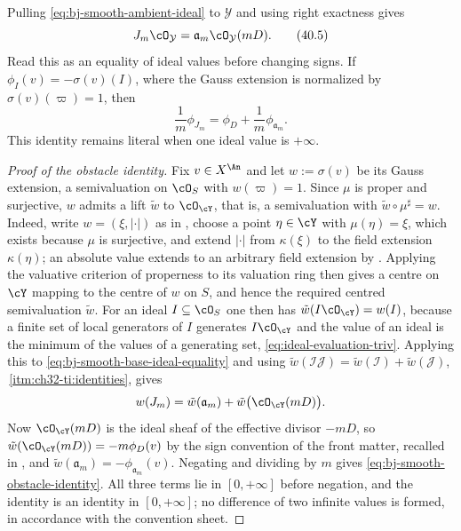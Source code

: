 Pulling \eqref{eq:bj-smooth-ambient-ideal} to $\mathcal Y$ and using
right exactness gives
\[
 J_m\cO_{\mathcal Y}
   =\mathfrak a_m\cO_{\mathcal Y}(mD).
\tag{40.5}\label{eq:bj-smooth-base-ideal-equality}
\]
Read this as an equality of ideal values before changing signs.  If
$\phi_I(v)=-\sigma(v)(I)$, where the Gauss extension is normalized by
$\sigma(v)(\varpi)=1$, then
\[
 \frac1m\phi_{J_m}
   =\phi_D+\frac1m\phi_{\mathfrak a_m}.
\tag{40.6}\label{eq:bj-smooth-obstacle-identity}
\]
This identity remains literal when one ideal value is $+\infty$.

\begin{proof}[Proof of the obstacle identity]
Fix $v\in X^{\An}$ and let $w:=\sigma(v)$ be its Gauss extension, a
semivaluation on $\cO_S$ with $w(\varpi)=1$.  Since $\mu$ is proper
and surjective, $w$ admits a lift $\tilde w$ to $\cO_{\cY}$,
that is, a semivaluation with $\tilde w\circ\mu^\sharp=w$.  Indeed, write
$w=(\xi,|\cdot|)$ as in , choose a point
$\eta\in\cY$ with $\mu(\eta)=\xi$, which exists because $\mu$ is
surjective, and extend $|\cdot|$ from $\kappa(\xi)$ to the field
extension $\kappa(\eta)$; an absolute value extends to an arbitrary field
extension by \cite[Chapter~VI, \S4]{ZariskiSamuelII}.  Applying the
valuative criterion of properness to its valuation ring then gives a centre
on $\cY$ mapping to the centre of $w$ on $S$, and hence the required
centred semivaluation $\tilde w$.  For an ideal
$I\subseteq\cO_S$ one then has
$\tilde w(I\cO_{\cY})=w(I)$, because a finite set of local generators of
$I$ generates $I\cO_{\cY}$ and the value of an ideal is the minimum of
the values of a generating set, \eqref{eq:ideal-evaluation-triv}.  Applying
this to \eqref{eq:bj-smooth-base-ideal-equality} and using
$\tilde w(\mathcal I\mathcal J)=\tilde w(\mathcal I)+\tilde w(\mathcal J)$,
\,\cref{itm:ch32-ti:identities}, gives
\[
 w(J_m)=\tilde w(\mathfrak a_m)+\tilde w\bigl(\cO_{\cY}(mD)\bigr).
\]
Now $\cO_{\cY}(mD)$ is the ideal sheaf of the effective divisor
$-mD$, so $\tilde w(\cO_{\cY}(mD))=-m\phi_D(v)$ by the sign convention of
the front matter, recalled in , and
$\tilde w(\mathfrak a_m)=-\phi_{\mathfrak a_m}(v)$.  Negating and dividing
by $m$ gives \eqref{eq:bj-smooth-obstacle-identity}.  All three terms lie
in $[0,+\infty]$ before negation, and the identity is an identity in
$[0,+\infty]$; no difference of two infinite values is formed, in
accordance with the convention sheet.
\end{proof}

